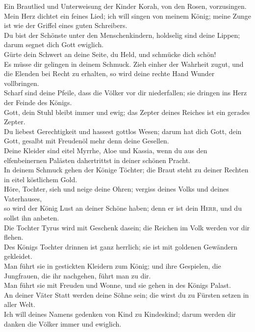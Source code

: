  Ein Brautlied und Unterweisung der Kinder Korah, von den
Rosen, vorzusingen.\\
 Mein Herz dichtet ein feines Lied; ich will singen von
meinem König; meine Zunge ist wie der Griffel eines guten Schreibers.\\
 Du bist der Schönste unter den Menschenkindern, holdselig
sind deine Lippen; darum segnet dich Gott ewiglich.\\
 Gürte dein Schwert an deine Seite, du Held, und schmücke
dich schön!\\
 Es müsse dir gelingen in deinem Schmuck. Zieh einher der
Wahrheit zugut, und die Elenden bei Recht zu erhalten, so wird deine
rechte Hand Wunder vollbringen.\\
 Scharf sind deine Pfeile, dass die Völker vor dir
niederfallen; sie dringen ins Herz der Feinde des Königs.\\
 Gott, dein Stuhl bleibt immer und ewig; das Zepter deines
Reiches ist ein gerades Zepter.\\
 Du liebest Gerechtigkeit und hassest gottlos Wesen; darum
hat dich Gott, dein Gott, gesalbt mit Freudenöl mehr denn deine
Gesellen.\\
 Deine Kleider sind eitel Myrrhe, Aloe und Kassia, wenn du
aus den elfenbeinernen Palästen dahertrittst in deiner schönen Pracht.\\
 In deinem Schmuck gehen der Könige Töchter; die Braut
steht zu deiner Rechten in eitel köstlichem Gold.\\
 Höre, Tochter, sieh und neige deine Ohren; vergiss
deines Volks und deines Vaterhauses,\\
 so wird der König Lust an deiner Schöne haben; denn er
ist dein \textsc{Herr}, und du sollst ihn anbeten.\\
 Die Tochter Tyrus wird mit Geschenk dasein; die Reichen
im Volk werden vor dir flehen.\\
 Des Königs Tochter drinnen ist ganz herrlich; sie ist
mit goldenen Gewändern gekleidet.\\
 Man führt sie in gestickten Kleidern zum König; und ihre
Gespielen, die Jungfrauen, die ihr nachgehen, führt man zu dir.\\
 Man führt sie mit Freuden und Wonne, und sie gehen in
des Königs Palast.\\
 An deiner Väter Statt werden deine Söhne sein; die wirst
du zu Fürsten setzen in aller Welt.\\
 Ich will deines Namens gedenken von Kind zu Kindeskind;
darum werden dir danken die Völker immer und ewiglich.

